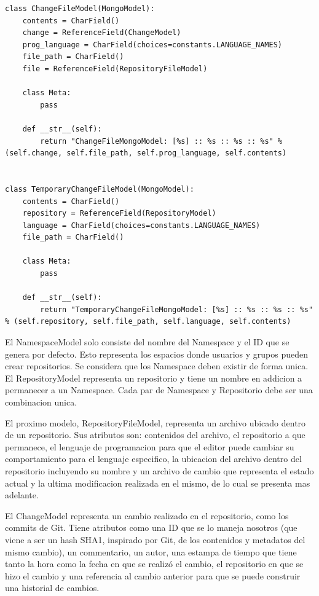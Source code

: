 \begin{lstlisting}[breaklines]
class ChangeFileModel(MongoModel):
    contents = CharField()
    change = ReferenceField(ChangeModel)
    prog_language = CharField(choices=constants.LANGUAGE_NAMES)
    file_path = CharField()
    file = ReferenceField(RepositoryFileModel)

    class Meta:
        pass

    def __str__(self):
        return "ChangeFileMongoModel: [%s] :: %s :: %s :: %s" % (self.change, self.file_path, self.prog_language, self.contents)


class TemporaryChangeFileModel(MongoModel):
    contents = CharField()
    repository = ReferenceField(RepositoryModel)
    language = CharField(choices=constants.LANGUAGE_NAMES)
    file_path = CharField()

    class Meta:
        pass

    def __str__(self):
        return "TemporaryChangeFileMongoModel: [%s] :: %s :: %s :: %s" % (self.repository, self.file_path, self.language, self.contents)
\end{lstlisting}
\lstset{language=Bash}

El NamespaceModel solo consiste del nombre del Namespace y el ID que se genera por defecto. Esto representa los espacios donde usuarios y grupos pueden crear repositorios. Se considera que los Namespace deben existir de forma unica. El RepositoryModel representa un repositorio y tiene un nombre en addicion a permanecer a un Namespace. Cada par de Namespace y Repositorio debe ser una combinacion unica.

El proximo modelo, RepositoryFileModel, representa un archivo ubicado dentro de un repositorio. Sus atributos son: contenidos del archivo, el repositorio a que permanece, el lenguaje de programacion para que el editor puede cambiar su comportamiento para el lenguaje especifico, la ubicacion del archivo dentro del repositorio incluyendo su nombre y un archivo de cambio que representa el estado actual y la ultima modificacion realizada en el mismo, de lo cual se presenta mas adelante.

El ChangeModel representa un cambio realizado en el repositorio, como los commits de Git. Tiene atributos como una ID que se lo maneja nosotros (que viene a ser un hash SHA1, inspirado por Git, de los contenidos y metadatos del mismo cambio), un commentario, un autor, una estampa de tiempo que tiene tanto la hora como la fecha en que se realizó el cambio, el repositorio en que se hizo el cambio y una referencia al cambio anterior para que se puede construir una historial de cambios.

